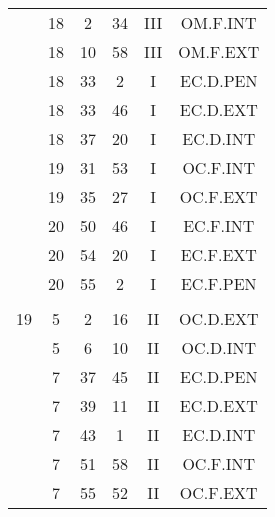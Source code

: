 \documentclass[12pt, a4paper]{article}
\begin{document}
\begin{multicols}{3}
{\begin{tabular}{c c c c c c}
	 	 	 	 & 18 & 2 & 34 & III & OM.F.INT\\%
	 	 	 	 & 18 & 10 & 58 & III & OM.F.EXT\\%
	 	 	 	 & 18 & 33 & 2 & I & EC.D.PEN\\%
	 	 	 	 & 18 & 33 & 46 & I & EC.D.EXT\\%
	 	 	 	 & 18 & 37 & 20 & I & EC.D.INT\\%
	 	 	 	 & 19 & 31 & 53 & I & OC.F.INT\\%
	 	 	 	 & 19 & 35 & 27 & I & OC.F.EXT\\%
	 	 	 	 & 20 & 50 & 46 & I & EC.F.INT\\%
	 	 	 	 & 20 & 54 & 20 & I & EC.F.EXT\\%
	 	 	 	 & 20 & 55 & 2 & I & EC.F.PEN\\%
	 	 	 	 & & & & & \\%
	 	 	 	19 & 5 & 2 & 16 & II & OC.D.EXT\\%
	 	 	 	 & 5 & 6 & 10 & II & OC.D.INT\\%
	 	 	 	 & 7 & 37 & 45 & II & EC.D.PEN\\%
	 	 	 	 & 7 & 39 & 11 & II & EC.D.EXT\\%
	 	 	 	 & 7 & 43 & 1 & II & EC.D.INT\\%
	 	 	 	 & 7 & 51 & 58 & II & OC.F.INT\\%
	 	 	 	 & 7 & 55 & 52 & II & OC.F.EXT\\%
	 	 \end{tabular}
 	}
\end{multicols}
\end{document}
